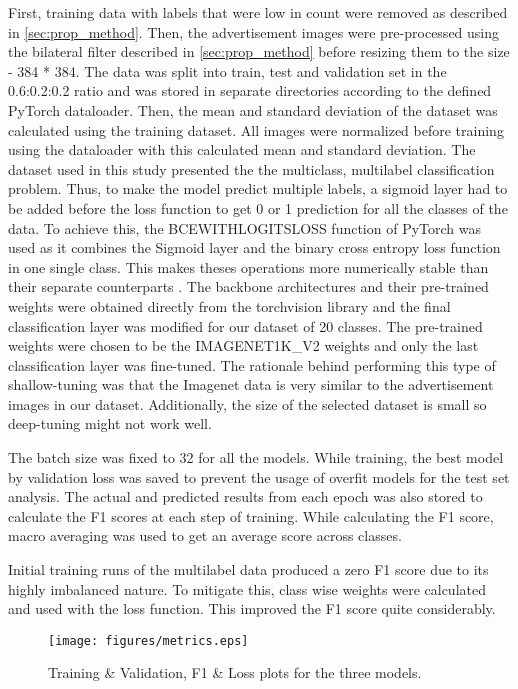 \documentclass[conference]{IEEEtran}
\begin{document}
First, training data with labels that were low in count were removed as described in \ref{sec:prop_method}. 
Then, the advertisement images were pre-processed using the bilateral filter described in 
\ref{sec:prop_method} before resizing them to the size - 384 * 384. The data was split into train, test and 
validation set in the 0.6:0.2:0.2 ratio and was stored in separate directories according to the defined PyTorch 
dataloader. Then, the mean and standard deviation of the dataset was calculated using the training dataset. 
All images were normalized before training using the dataloader with this calculated 
mean and standard deviation.
The dataset used in this study presented the the multiclass, multilabel classification problem. 
Thus, to make the model predict multiple labels, a sigmoid layer had to be added before the 
loss function to get 0 or 1 prediction for all the classes of the data. To achieve this, the 
BCEWITHLOGITSLOSS function of PyTorch was used as it combines the Sigmoid layer and the 
binary cross entropy loss function in one single class. This makes 
theses operations more numerically stable than their separate counterparts \cite{bcelogits_}.
The backbone architectures and their pre-trained weights were obtained directly from the 
torchvision library and the final classification layer was modified for our dataset of 20 classes. 
The pre-trained weights were chosen to be the IMAGENET1K\_V2 weights and only the last 
classification layer was fine-tuned. The rationale behind performing this type of 
shallow-tuning was that the Imagenet data is very similar to the advertisement images in our 
dataset. Additionally, the size of the selected dataset is small so deep-tuning might not work well. 

The batch size was fixed to 32 for all the models. While training, the best model by 
validation loss was saved to prevent the usage of overfit models for the test set analysis. 
The actual and predicted results from each epoch was also stored to calculate the F1 scores at 
each step of training. While calculating the F1 score, macro averaging 
was used to get an average score across classes. 

Initial training runs of the multilabel data produced a zero F1 score due to its highly imbalanced 
nature. To mitigate this, class wise weights were calculated and used with the loss function. 
This improved the F1 score quite considerably.






\begin{figure}[htbp]
    \centering
    \texttt{[image: figures/metrics.eps]}  
     \caption{Training \& Validation, F1 \& Loss plots for the three models.}
     \label{fig:acc_loss}
  \end{figure}
\end{document}
